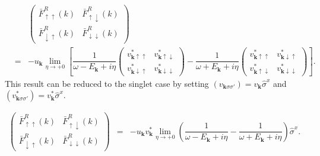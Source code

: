\documentclass[uplatex,a4j,12pt,dvipdfmx]{jsarticle}
\begin{document}
\begin{eqnarray}
	&&
	\left(
	\begin{array}{cc}
			\bar{F}_{\uparrow \uparrow}^{R}(k)   & \bar{F}_{\uparrow \downarrow}^{R}(k)   \\[3mm]
			\bar{F}_{\downarrow \uparrow}^{R}(k) & \bar{F}_{\downarrow \downarrow}^{R}(k)
		\end{array}
	\right)
	\nonumber \\[4mm] &=&
	-
	u_{ \bm{k} }
	\lim_{\eta \to +0}
	\left[
		\dfrac{ 1 }{ \omega - E_{\bm{k}} + i \eta }
		\left(
		\begin{array}{cc}
				v_{\bm{k} \uparrow \uparrow}^{*}
				 &
				v_{\bm{k} \uparrow \downarrow}^{*}
				\\[3mm]
				v_{\bm{k} \downarrow \uparrow}^{*}
				 &
				v_{\bm{k} \downarrow \downarrow}^{*}
			\end{array}
		\right)
		-
		\dfrac{ 1 }{ \omega + E_{\bm{k}} + i \eta }
		\left(
		\begin{array}{cc}
				v_{\bm{k} \uparrow \uparrow}^{*}
				 &
				v_{\bm{k} \downarrow \uparrow}^{*}
				\\[3mm]
				v_{\bm{k} \uparrow \downarrow}^{*}
				 &
				v_{\bm{k} \downarrow \downarrow}^{*}
			\end{array}
		\right)
		\right]
	.
\end{eqnarray}
%
This result can be reduced to the singlet case by setting $(v_{\bm{k} \sigma \sigma'}) = v_{\bm{k}} \hat{\sigma}^{x}$
and
$(v_{\bm{k} \sigma \sigma'}^{*}) = v_{\bm{k}}^{*} \hat{\sigma}^{x}$.

\begin{eqnarray}
	\left(
	\begin{array}{cc}
			\bar{F}_{\uparrow \uparrow}^{R}(k)   & \bar{F}_{\uparrow \downarrow}^{R}(k)   \\[3mm]
			\bar{F}_{\downarrow \uparrow}^{R}(k) & \bar{F}_{\downarrow \downarrow}^{R}(k)
		\end{array}
	\right)
	&=&
	-
	u_{ \bm{k} }
	v_{ \bm{k} }^{*}
	\lim_{\eta \to +0}
	\left(
	\dfrac{ 1 }{ \omega - E_{\bm{k}} + i \eta }
	-
	\dfrac{ 1 }{ \omega + E_{\bm{k}} + i \eta }
	\right)
	\hat{\sigma}^{x}
	.
\end{eqnarray}
\end{document}
